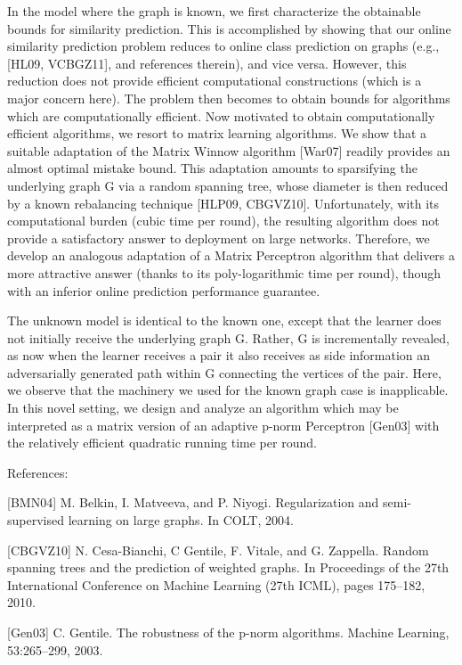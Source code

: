 \documentclass[10pt]{article}
\begin{document}
\begin{multicols}{2}
In the model where the graph is known, we first characterize the obtainable bounds for similarity prediction. This is accomplished by showing that our online similarity prediction problem reduces to online class prediction on graphs (e.g., [HL09, VCBGZ11], and references therein), and vice versa. However, this reduction does not provide efficient computational constructions (which is a major concern here). The problem then becomes to obtain bounds for algorithms which are computationally efficient. Now motivated to obtain computationally efficient algorithms, we resort to matrix learning algorithms. We show that a suitable adaptation of the Matrix Winnow algorithm [War07] readily provides an almost optimal mistake bound. This adaptation amounts to sparsifying the underlying graph G via a random spanning tree, whose diameter is then reduced by a known rebalancing technique [HLP09, CBGVZ10]. Unfortunately, with its computational burden (cubic time per round), the resulting algorithm does not provide a satisfactory answer to deployment on large networks. Therefore, we develop an analogous adaptation of a Matrix Perceptron algorithm that delivers a more attractive answer (thanks to its poly-logarithmic time per round), though with an inferior online prediction performance guarantee.

The unknown model is identical to the known one, except that the learner does not initially receive the underlying graph G. Rather, G is incrementally revealed, as now when the learner receives a pair it also receives as side information an adversarially generated path within G connecting the vertices of the pair. Here, we observe that the machinery we used for the known graph case is inapplicable. In this novel setting, we design and analyze an algorithm which may be interpreted as a matrix version of an adaptive p-norm Perceptron [Gen03] with the relatively efficient quadratic running time per round.

References:

    [BMN04] M. Belkin, I. Matveeva, and P. Niyogi. Regularization and semi-supervised learning on large graphs. In COLT, 2004.

    [CBGVZ10] N. Cesa-Bianchi, C Gentile, F. Vitale, and G. Zappella. Random spanning trees and the prediction of weighted graphs. In Proceedings of the 27th International Conference on Machine Learning (27th ICML), pages 175–182, 2010.

    [Gen03] C. Gentile. The robustness of the p-norm algorithms. Machine Learning, 53:265–299, 2003.


\end{multicols}
\end{document}
